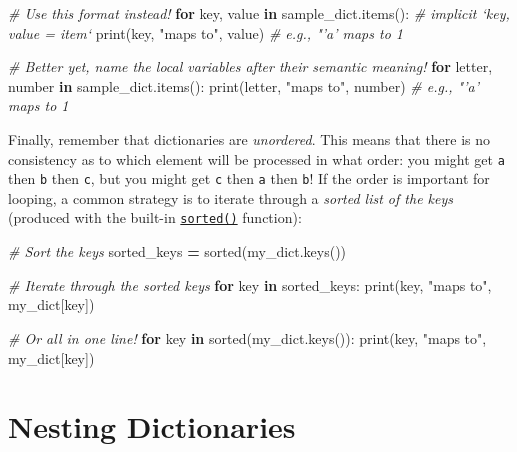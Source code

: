 \documentclass[]{book}
\newenvironment{Shaded}{\begin{snugshade}}{\end{snugshade}}
\newcommand{\KeywordTok}[1]{\textcolor[rgb]{0.13,0.29,0.53}{\textbf{#1}}}
\newcommand{\StringTok}[1]{\textcolor[rgb]{0.31,0.60,0.02}{#1}}
\newcommand{\CommentTok}[1]{\textcolor[rgb]{0.56,0.35,0.01}{\textit{#1}}}
\newcommand{\ControlFlowTok}[1]{\textcolor[rgb]{0.13,0.29,0.53}{\textbf{#1}}}
\newcommand{\OperatorTok}[1]{\textcolor[rgb]{0.81,0.36,0.00}{\textbf{#1}}}
\newcommand{\BuiltInTok}[1]{#1}
\newcommand{\NormalTok}[1]{#1}
\begin{document}
\begin{Shaded}
\begin{Highlighting}[]
\CommentTok{# Use this format instead!}
\ControlFlowTok{for}\NormalTok{ key, value }\KeywordTok{in}\NormalTok{ sample_dict.items():  }\CommentTok{# implicit  `key, value = item`}
    \BuiltInTok{print}\NormalTok{(key, }\StringTok{"maps to"}\NormalTok{, value)  }\CommentTok{# e.g., "'a' maps to 1}

\CommentTok{# Better yet, name the local variables after their semantic meaning!}
\ControlFlowTok{for}\NormalTok{ letter, number }\KeywordTok{in}\NormalTok{ sample_dict.items():}
    \BuiltInTok{print}\NormalTok{(letter, }\StringTok{"maps to"}\NormalTok{, number)  }\CommentTok{# e.g., "'a' maps to 1}
\end{Highlighting}
\end{Shaded}

Finally, remember that dictionaries are \emph{unordered}. This means
that there is no consistency as to which element will be processed in
what order: you might get \texttt{a} then \texttt{b} then \texttt{c},
but you might get \texttt{c} then \texttt{a} then \texttt{b}! If the
order is important for looping, a common strategy is to iterate through
a \emph{sorted list of the keys} (produced with the built-in
\href{https://docs.python.org/3/library/functions.html\#sorted}{\texttt{sorted()}}
function):

\begin{Shaded}
\begin{Highlighting}[]
\CommentTok{# Sort the keys}
\NormalTok{sorted_keys }\OperatorTok{=} \BuiltInTok{sorted}\NormalTok{(my_dict.keys())}

\CommentTok{# Iterate through the sorted keys}
\ControlFlowTok{for}\NormalTok{ key }\KeywordTok{in}\NormalTok{ sorted_keys:}
    \BuiltInTok{print}\NormalTok{(key, }\StringTok{"maps to"}\NormalTok{, my_dict[key])}

\CommentTok{# Or all in one line!}
\ControlFlowTok{for}\NormalTok{ key }\KeywordTok{in} \BuiltInTok{sorted}\NormalTok{(my_dict.keys()):}
    \BuiltInTok{print}\NormalTok{(key, }\StringTok{"maps to"}\NormalTok{, my_dict[key])}
\end{Highlighting}
\end{Shaded}

\hypertarget{nesting-dictionaries}{\section{Nesting
Dictionaries}\label{nesting-dictionaries}}
\end{document}
